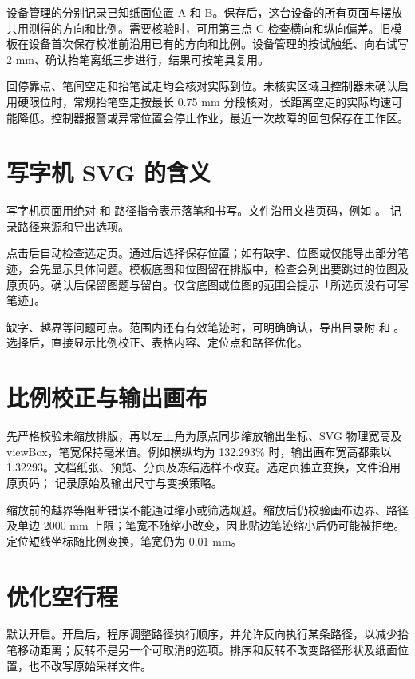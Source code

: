 设备管理的分别记录已知纸面位置 A 和 B。保存后，这台设备的所有页面与摆放共用测得的方向和比例。需要核验时，可用第三点 C 检查横向和纵向偏差。旧模板在设备首次保存校准前沿用已有的方向和比例。设备管理的按试触纸、向右试写 2 mm、确认抬笔离纸三步进行，结果可按笔具复用。

回停靠点、笔间空走和抬笔试走均会核对实际到位。未核实区域且控制器未确认启用硬限位时，常规抬笔空走按最长 0.75 mm 分段核对，长距离空走的实际均速可能降低。控制器报警或异常位置会停止作业，最近一次故障的回包保存在工作区。

\section{写字机 SVG 的含义}
写字机页面用绝对  和  路径指令表示落笔和书写。文件沿用文档页码，例如 。 记录路径来源和导出选项。

点击后自动检查选定页。通过后选择保存位置；如有缺字、位图或仅能导出部分笔迹，会先显示具体问题。模板底图和位图留在排版中，检查会列出要跳过的位图及原页码。确认后保留图题与留白。仅含底图或位图的范围会提示「所选页没有可写笔迹」。

缺字、越界等问题可点。范围内还有有效笔迹时，可明确确认，导出目录附  和 。选择后，直接显示比例校正、表格内容、定位点和路径优化。

\section{比例校正与输出画布}
先严格校验未缩放排版，再以左上角为原点同步缩放输出坐标、SVG 物理宽高及 viewBox，笔宽保持毫米值。例如横纵均为 132.293\% 时，输出画布宽高都乘以 1.32293。文档纸张、预览、分页及冻结选样不改变。选定页独立变换，文件沿用原页码； 记录原始及输出尺寸与变换策略。

缩放前的越界等阻断错误不能通过缩小或筛选规避。缩放后仍校验画布边界、路径及单边 2000 mm 上限；笔宽不随缩小改变，因此贴边笔迹缩小后仍可能被拒绝。定位短线坐标随比例变换，笔宽仍为 0.01 mm。

\section{优化空行程}
默认开启。开启后，程序调整路径执行顺序，并允许反向执行某条路径，以减少抬笔移动距离；反转不是另一个可取消的选项。排序和反转不改变路径形状及纸面位置，也不改写原始采样文件。

